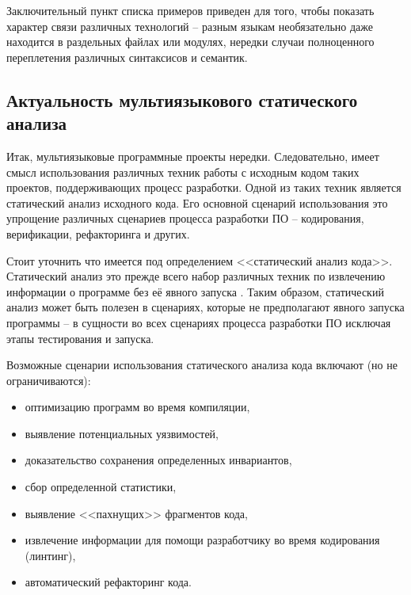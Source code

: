 Заключительный пункт списка примеров приведен для того, чтобы показать характер
связи различных технологий -- разным языкам необязательно даже находится в раздельных
файлах или модулях, нередки случаи полноценного переплетения различных синтаксисов и
семантик.

\subsection{Актуальность мультиязыкового статического анализа}

Итак, мультиязыковые программные проекты нередки. Следовательно, имеет смысл использования
различных техник работы с исходным кодом таких проектов, поддерживающих процесс разработки.
Одной из таких техник является статический анализ исходного кода. Его основной сценарий
использования это упрощение различных сценариев процесса разработки ПО -- кодирования,
верификации, рефакторинга и других.

Стоит уточнить что имеется под определением <<статический анализ кода>>. Статический
анализ это прежде всего набор различных техник по извлечению информации о программе без её
явного запуска \cite{static-program-analysis}. Таким образом, статический анализ может
быть полезен в сценариях, которые не предполагают явного запуска программы -- в сущности во
всех сценариях процесса разработки ПО исключая этапы тестирования и запуска.

Возможные сценарии использования статического анализа кода включают (но не ограничиваются):
\begin{itemize}
    \item оптимизацию программ во время компиляции,
    \item выявление потенциальных уязвимостей,
    \item доказательство сохранения определенных инвариантов,
    \item сбор определенной статистики,
    \item выявление <<пахнущих>> фрагментов кода,
    \item извлечение информации для помощи разработчику во время кодирования (линтинг),
    \item автоматический рефакторинг кода.
\end{itemize}

